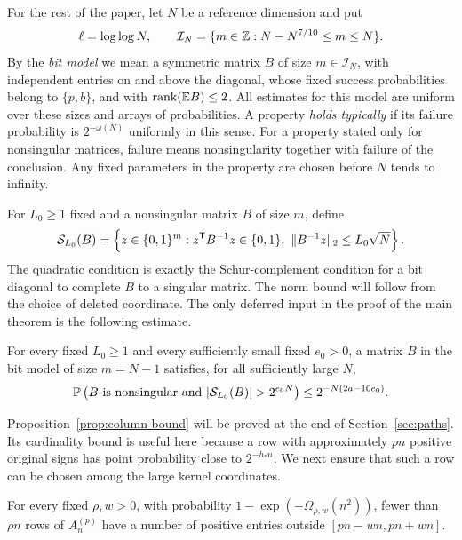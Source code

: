 For the rest of the paper, let \(N\) be a reference dimension and put
\begin{equation}\label{eq:reference-range}
 \ell=\log\log N,\qquad
 \mathcal I_N=\{m\in\mathbb Z:N-N^{7/10}\le m\le N\}.
\end{equation}
By the \emph{bit model} we mean a symmetric matrix \(B\) of size
\(m\in\mathcal I_N\), with independent entries on and above the
diagonal, whose fixed success probabilities belong to
\(\{p,b\}\), and with \(\operatorname{rank}(\mathbb E B)\le2\).
All estimates for this model are uniform over these sizes and
arrays of probabilities. A property \emph{holds typically} if
its failure probability is \(2^{-\omega(N)}\) uniformly in this
sense. For a property stated only for nonsingular matrices,
failure means nonsingularity together with failure of the
conclusion. Any fixed parameters in the property are chosen
before \(N\) tends to infinity.

For \(L_0\ge1\) fixed and a nonsingular matrix \(B\) of size \(m\),
define
\begin{equation}\label{eq:admissible-columns}
 \mathcal S_{L_0}(B)=
 \left\{z\in\{0,1\}^m:
 z^{\mathsf T}B^{-1}z\in\{0,1\},\
 \lVert B^{-1}z\rVert_2\le L_0\sqrt N\right\}.
\end{equation}
The quadratic condition is exactly the Schur-complement condition
for a bit diagonal to complete \(B\) to a singular matrix.
The norm bound will follow from the choice of deleted coordinate.
The only deferred input in the proof of the main theorem is the
following estimate.

\begin{proposition}\label{prop:column-bound}
For every fixed \(L_0\ge1\) and every sufficiently small fixed
\(e_0>0\), a matrix \(B\) in the bit model of size \(m=N-1\)
satisfies, for all sufficiently large \(N\),
\[
 \Prob\left(
 B\text{ is nonsingular and }
 |\mathcal S_{L_0}(B)|>2^{e_0N}
 \right)
 \le 2^{-N(2a-10e_0)}.
\]
\end{proposition}

Proposition~\ref{prop:column-bound} will be proved at the end of
Section~\ref{sec:paths}. Its cardinality bound is useful here
because a row with approximately \(pn\) positive original signs
has point probability close to \(2^{-h_*n}\). We next ensure
that such a row can be chosen among the large kernel coordinates.

\begin{lemma}\label{lem:row-counts}
For every fixed \(\rho,w>0\), with probability
\(1-\exp(-\Omega_{\rho,w}(n^2))\), fewer than \(\rho n\) rows
of \(A_n^{(p)}\) have a number of positive entries outside
\([pn-wn,pn+wn]\).
\end{lemma}

